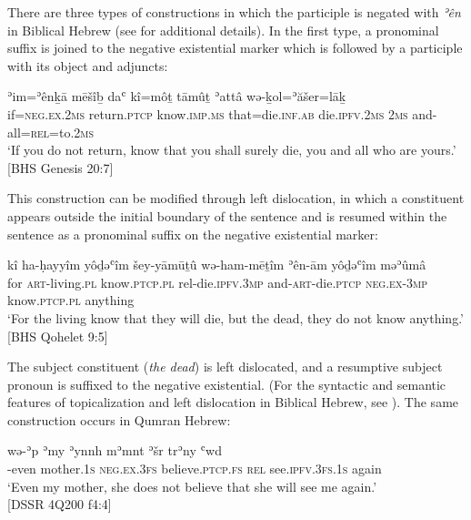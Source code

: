 ﻿\documentclass[output=paper]{langsci/langscibook}
\begin{document}
There are three types of constructions in which the participle is negated
with \textit{ʾên} in Biblical Hebrew  (see \citeauthor{MillerNaude2015}
\citeyear{MillerNaude2015}
for additional
details). In the first type, a pronominal suffix is
joined to the negative existential marker which is followed by a participle
with its object and adjuncts:
%
\begin{exe}\ex \label{ex:heb-you-die}
    \gll ʾim=ʾênḵā mēšîḇ daʿ kî=môṯ tāmûṯ ʾattâ wə-ḵol=ʾăšer=lāḵ \\
    if=\textsc{neg.ex.2ms} return.\textsc{ptcp} know.\textsc{imp.ms}
  that=die\textsc{.inf.ab}   die.\textsc{ipfv.2ms} \textsc{2ms}
  and-all=\textsc{rel}=to.\textsc{2ms}  \\
    \glt `If you do not return, know that you shall surely die, you and all who
are yours.' [BHS Genesis 20:7]
    \end{exe}
%
This construction can be modified through left dislocation, in which a constituent appears outside the initial boundary of the sentence and is resumed within the sentence as a pronominal suffix on the negative existential marker:
%
\begin{exe}\ex \label{ex:heb-dead}
    \gll kî ha-ḥayyîm  yôḏǝʿîm    šey-yāmūṯû wə-ham-mēṯîm ʾên-ām yôḏǝʿîm
    məʾûmâ       \\ 
    for \textsc{art}-living.\textsc{pl} know.\textsc{ptcp.pl}
    rel-die.\textsc{ipfv.3mp} and-\textsc{art}-die.\textsc{ptcp}
    \textsc{neg.ex}-\textsc{3mp} know.\textsc{ptcp.pl} anything \\
    \glt
`For the living know that they will die, but the dead, they do not   know
anything.' [BHS Qohelet 9:5]
    \end{exe}
%
The subject constituent (\textit{the dead}) is left dislocated, and a
resumptive subject pronoun is suffixed to the negative existential. (For
the syntactic and semantic features of topicalization and left dislocation
in Biblical Hebrew, see \cites{Naude1990}{Holmstedt2014}{NaudeMiller2017}). The same construction occurs in
Qumran Hebrew:
%
\begin{exe}\ex \label{ex:heb-my-mother}
    \gll {\ob}wə{\cb}-ʾp    ʾmy    ʾynnh    mʾmnt ʾšr trʾn{\ob}y{\cb} ʿwd\\
    [and]-even   mother.\textsc{1s}    \textsc{neg.ex.3fs}
    believe.\textsc{ptcp.fs} \textsc{rel}   see.\textsc{ipfv.3fs.1s}
    again\\
    \glt `Even my mother, she does not believe that she will see me
    again.'\\
             [DSSR 4Q200 f4:4]
    \end{exe}
\end{document}
